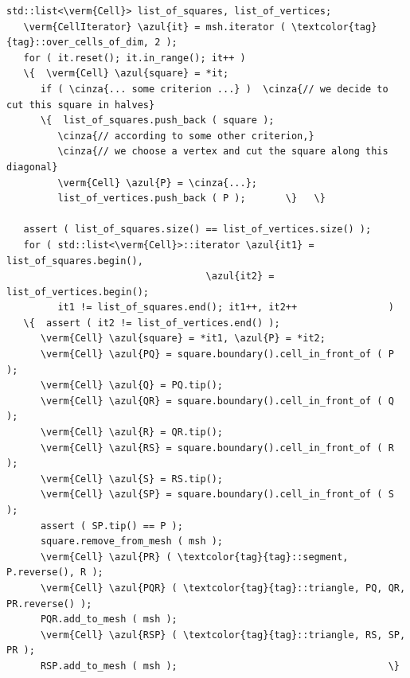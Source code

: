 \begin{Verbatim}[commandchars=\\\{\},formatcom=\small\tt,frame=single,
   label=parag-\ref{\numb section 10.\numb parag 3}.cpp,rulecolor=\color{coment},
   baselinestretch=0.94,framesep=2mm]
   std::list<\verm{Cell}> list_of_squares, list_of_vertices;
   \verm{CellIterator} \azul{it} = msh.iterator ( \textcolor{tag}{tag}::over_cells_of_dim, 2 );
   for ( it.reset(); it.in_range(); it++ )
   \{  \verm{Cell} \azul{square} = *it;
      if ( \cinza{... some criterion ...} )  \cinza{// we decide to cut this square in halves}
      \{  list_of_squares.push_back ( square );
         \cinza{// according to some other criterion,}
         \cinza{// we choose a vertex and cut the square along this diagonal}
         \verm{Cell} \azul{P} = \cinza{...};  
         list_of_vertices.push_back ( P );       \}   \}

   assert ( list_of_squares.size() == list_of_vertices.size() );
   for ( std::list<\verm{Cell}>::iterator \azul{it1} = list_of_squares.begin(),
                                   \azul{it2} = list_of_vertices.begin();
         it1 != list_of_squares.end(); it1++, it2++                )
   \{  assert ( it2 != list_of_vertices.end() );
      \verm{Cell} \azul{square} = *it1, \azul{P} = *it2;
      \verm{Cell} \azul{PQ} = square.boundary().cell_in_front_of ( P );
      \verm{Cell} \azul{Q} = PQ.tip();
      \verm{Cell} \azul{QR} = square.boundary().cell_in_front_of ( Q );
      \verm{Cell} \azul{R} = QR.tip();
      \verm{Cell} \azul{RS} = square.boundary().cell_in_front_of ( R );
      \verm{Cell} \azul{S} = RS.tip();
      \verm{Cell} \azul{SP} = square.boundary().cell_in_front_of ( S );
      assert ( SP.tip() == P );
      square.remove_from_mesh ( msh );
      \verm{Cell} \azul{PR} ( \textcolor{tag}{tag}::segment, P.reverse(), R );
      \verm{Cell} \azul{PQR} ( \textcolor{tag}{tag}::triangle, PQ, QR, PR.reverse() );
      PQR.add_to_mesh ( msh );
      \verm{Cell} \azul{RSP} ( \textcolor{tag}{tag}::triangle, RS, SP, PR );
      RSP.add_to_mesh ( msh );                                     \}
\end{Verbatim}

